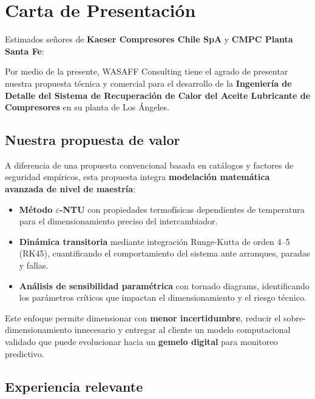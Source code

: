 \documentclass[11pt,a4paper]{article}
\begin{document}
\tableofcontents
\newpage

\section{Carta de Presentación}

Estimados señores de \textbf{Kaeser Compresores Chile SpA} y \textbf{CMPC Planta Santa Fe}:

Por medio de la presente, WASAFF Consulting tiene el agrado de presentar nuestra propuesta técnica y comercial para el desarrollo de la \textbf{Ingeniería de Detalle del Sistema de Recuperación de Calor del Aceite Lubricante de Compresores} en su planta de Los Ángeles.

\subsection{Nuestra propuesta de valor}

A diferencia de una propuesta convencional basada en catálogos y factores de seguridad empíricos, esta propuesta integra \textbf{modelación matemática avanzada de nivel de maestría}:

\begin{itemize}
  \item \textbf{Método $\varepsilon$-NTU} con propiedades termofísicas dependientes de temperatura para el dimensionamiento preciso del intercambiador.
  \item \textbf{Dinámica transitoria} mediante integración Runge-Kutta de orden 4--5 (RK45), cuantificando el comportamiento del sistema ante arranques, paradas y fallas.
  \item \textbf{Análisis de sensibilidad paramétrica} con tornado diagrams, identificando los parámetros críticos que impactan el dimensionamiento y el riesgo técnico.
\end{itemize}

Este enfoque permite dimensionar con \textbf{menor incertidumbre}, reducir el sobre-dimensionamiento innecesario y entregar al cliente un modelo computacional validado que puede evolucionar hacia un \textbf{gemelo digital} para monitoreo predictivo.

\subsection{Experiencia relevante}
\end{document}
